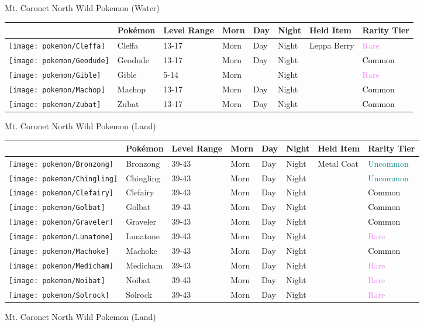 \caption{Mt. Coronet North Wild Pokemon (Water)}%
\begin{longtable}{||l l l l l l l l||}%
\hline%
&Pokémon&Level Range&Morn&Day&Night&Held Item&Rarity Tier\\%
\hline%
\endhead%
\hline%
\texttt{[image: pokemon/Cleffa]}&Cleffa&13{-}17&Morn&Day&Night&Leppa Berry&\textcolor{violet}{%
Rare%
}\\%
\hline%
\texttt{[image: pokemon/Geodude]}&Geodude&13{-}17&Morn&Day&Night&&\textcolor{black}{%
Common%
}\\%
\hline%
\texttt{[image: pokemon/Gible]}&Gible&5{-}14&Morn&&Night&&\textcolor{violet}{%
Rare%
}\\%
\hline%
\texttt{[image: pokemon/Machop]}&Machop&13{-}17&Morn&Day&Night&&\textcolor{black}{%
Common%
}\\%
\hline%
\texttt{[image: pokemon/Zubat]}&Zubat&13{-}17&Morn&Day&Night&&\textcolor{black}{%
Common%
}\\%
\hline%
\end{longtable}%
\caption{Mt. Coronet North Wild Pokemon (Land)}%
\begin{longtable}{||l l l l l l l l||}%
\hline%
&Pokémon&Level Range&Morn&Day&Night&Held Item&Rarity Tier\\%
\hline%
\endhead%
\hline%
\texttt{[image: pokemon/Bronzong]}&Bronzong&39{-}43&Morn&Day&Night&Metal Coat&\textcolor{teal}{%
Uncommon%
}\\%
\hline%
\texttt{[image: pokemon/Chingling]}&Chingling&39{-}43&Morn&Day&Night&&\textcolor{teal}{%
Uncommon%
}\\%
\hline%
\texttt{[image: pokemon/Clefairy]}&Clefairy&39{-}43&Morn&Day&Night&&\textcolor{black}{%
Common%
}\\%
\hline%
\texttt{[image: pokemon/Golbat]}&Golbat&39{-}43&Morn&Day&Night&&\textcolor{black}{%
Common%
}\\%
\hline%
\texttt{[image: pokemon/Graveler]}&Graveler&39{-}43&Morn&Day&Night&&\textcolor{black}{%
Common%
}\\%
\hline%
\texttt{[image: pokemon/Lunatone]}&Lunatone&39{-}43&Morn&Day&Night&&\textcolor{violet}{%
Rare%
}\\%
\hline%
\texttt{[image: pokemon/Machoke]}&Machoke&39{-}43&Morn&Day&Night&&\textcolor{black}{%
Common%
}\\%
\hline%
\texttt{[image: pokemon/Medicham]}&Medicham&39{-}43&Morn&Day&Night&&\textcolor{violet}{%
Rare%
}\\%
\hline%
\texttt{[image: pokemon/Noibat]}&Noibat&39{-}43&Morn&Day&Night&&\textcolor{violet}{%
Rare%
}\\%
\hline%
\texttt{[image: pokemon/Solrock]}&Solrock&39{-}43&Morn&Day&Night&&\textcolor{violet}{%
Rare%
}\\%
\hline%
\end{longtable}%
\caption{Mt. Coronet North Wild Pokemon (Land)}